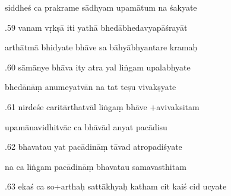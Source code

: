 \documentclass[article,12pt,a4paper]{memoir}%
\newcounter{parCount}
\begin{document}
	  
	  \pstart \leavevmode%
	siddheś ca prakrame sādhyam upamātum na śakyate 
	{}
	\pend%
      

	  
	  \pstart {}.59 vanam vṛkṣā iti yathā bhedābhedavyapāśrayāt 
	{}
	\pend%
      

	  
	  \pstart \leavevmode%
	arthātmā bhidyate bhāve sa bāhyābhyantare kramaḥ 
	{}
	\pend%
      

	  
	  \pstart {}.60 sāmānye bhāva ity atra yal liṅgam upalabhyate 
	{}
	\pend%
      

	  
	  \pstart \leavevmode%
	bhedānāṃ anumeyatvān na tat teṣu vivakṣyate 
	{}
	\pend%
      

	  
	  \pstart {}.61 nirdeśe caritārthatvāl liṅgaṃ bhāve +avivaksitam 
	{}
	\pend%
      

	  
	  \pstart \leavevmode%
	upamānavidhitvāc ca bhāvād anyat pacādisu 
	{}
	\pend%
      

	  
	  \pstart {}.62 bhavatau yat pacādināṃ tāvad atropadiśyate 
	{}
	\pend%
      

	  
	  \pstart \leavevmode%
	na ca liṅgam pacādināṃ bhavatau samavasthitam 
	{}
	\pend%
      

	  
	  \pstart {}.63 ekaś ca so+arthaḥ sattākhyaḥ katham cit kaiś cid ucyate 
	{}
	\pend%
      
\end{document}

